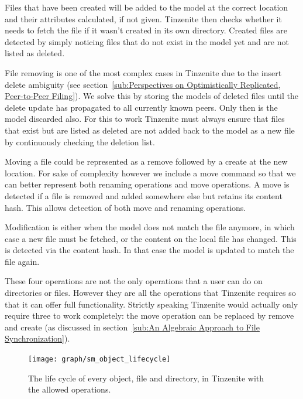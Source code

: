 \begin{description}[leftmargin=5em,style=nextline,noitemsep,nolistsep]
    \item[Create]
        Files that have been created will be added to the model at the correct location and their attributes calculated, if not given.
        Tinzenite then checks whether it needs to fetch the file if it wasn't created in its own directory.
        Created files are detected by simply noticing files that do not exist in the model yet and are not listed as deleted.
    \item[Remove]
        File removing is one of the most complex cases in Tinzenite due to the insert delete ambiguity (see section~\ref{sub:Perspectives on Optimistically Replicated, Peer-to-Peer Filing}).
        We solve this by storing the models of deleted files until the delete update has propagated to all currently known peers.
        Only then is the model discarded also.
        For this to work Tinzenite must always ensure that files that exist but are listed as deleted are not added back to the model as a new file by continuously checking the deletion list.
    \item[Move]
        Moving a file could be represented as a remove followed by a create at the new location.
        For sake of complexity however we include a move command so that we can better represent both renaming operations and move operations.
        A move is detected if a file is removed and added somewhere else but retains its content hash.
        This allows detection of both move and renaming operations.
    \item[Modify]
        Modification is either when the model does not match the file anymore, in which case a new file must be fetched, or the content on the local file has changed.
        This is detected via the content hash.
        In that case the model is updated to match the file again.
\end{description}

These four operations are not the only operations that a user can do on directories or files.
However they are all the operations that Tinzenite requires so that it can offer full functionality.
Strictly speaking Tinzenite would actually only require three to work completely: the move operation can be replaced by remove and create (as discussed in section~\ref{sub:An Algebraic Approach to File Synchronization}).

\begin{figure}[htp]
\centering
    \texttt{[image: graph/sm\_object\_lifecycle]}
\caption[Object State Diagram]{The life cycle of every object, file and directory, in Tinzenite with the allowed operations.}
\label{diagram:object_operations}
\end{figure}

